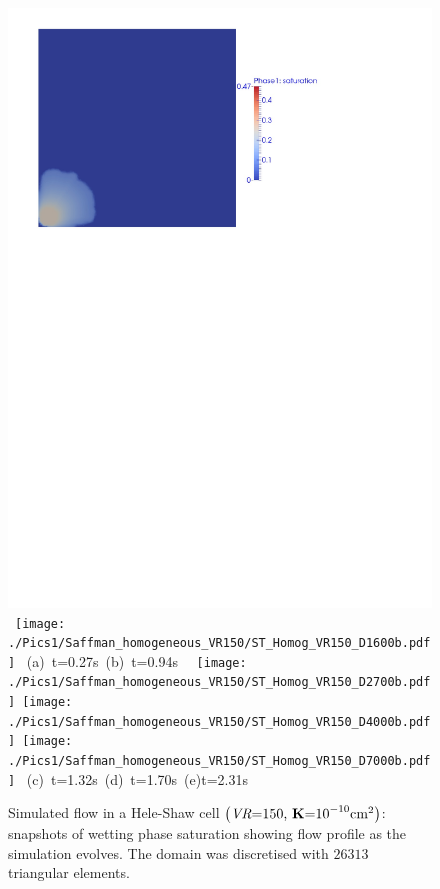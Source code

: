 \begin{landscape}
\begin{figure}[ht] 
\vbox{\vspace{-1cm}
\hbox{\includegraphics[width=.7\textwidth]{./Pics1/Saffman_homogeneous_VR150/ST_Homog_VR150_D300bcd.pdf}
\hspace{0.5cm}      
      \texttt{[image: ./Pics1/Saffman\_homogeneous\_VR150/ST\_Homog\_VR150\_D1600b.pdf]}}
\vspace{0.cm}
\hbox{\hspace{5.cm} (a) t=0.27s \hspace{8.cm} (b) t=0.94s }
\vspace{0.5cm}
\hbox{
      \texttt{[image: ./Pics1/Saffman\_homogeneous\_VR150/ST\_Homog\_VR150\_D2700b.pdf]}
      \texttt{[image: ./Pics1/Saffman\_homogeneous\_VR150/ST\_Homog\_VR150\_D4000b.pdf]}
      \texttt{[image: ./Pics1/Saffman\_homogeneous\_VR150/ST\_Homog\_VR150\_D7000b.pdf]}}
\vspace{0.cm}
\hbox{ \hspace{2.cm} (c) t=1.32s \hspace{4.5cm} (d) t=1.70s \hspace{5.cm} (e)t=2.31s}
\vspace{0.cm}
}   
\caption{Simulated flow in a Hele-Shaw cell $\left(\text{{\it VR}=150, {\bf K}=10}^{-10}\text{cm}^{2}\right)$: snapshots of wetting phase saturation showing flow profile as the simulation evolves. The domain was discretised with $26313$  triangular elements.}
\label{fig:homoheleshaw_VN150}
\end{figure}
\end{landscape}
\clearpage


